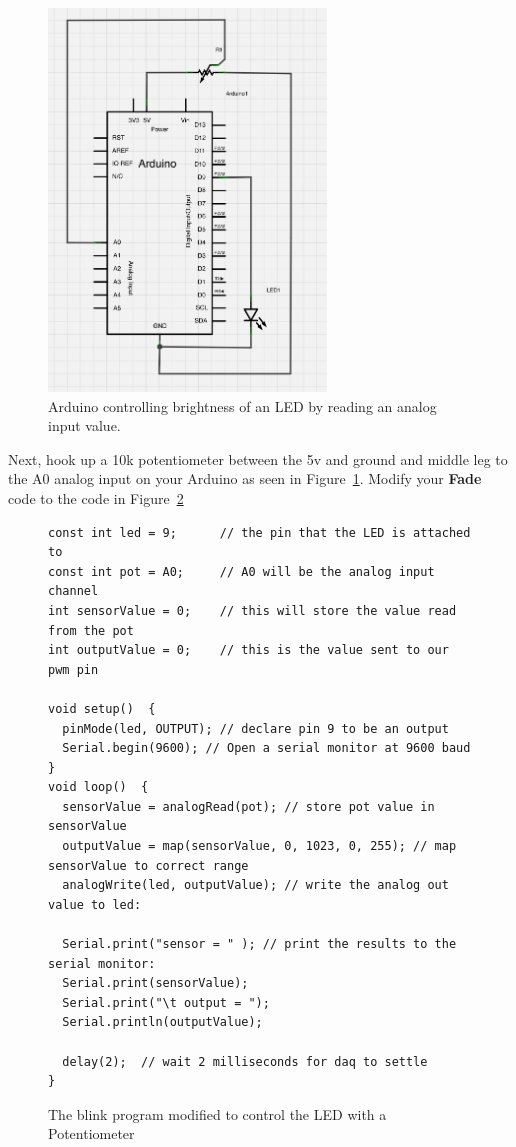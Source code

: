 \documentclass[11pt,a4paper]{article}
\begin{document}
\begin{figure}[htbp]
    \centering
        \includegraphics[height=4in]{figures/pot-fade.png}
    \caption{Arduino controlling brightness of an LED by reading an analog input value.}
    \label{fig:figures_pot-fade}
\end{figure}


Next, hook up a 10k potentiometer between the 5v and ground and middle leg to the A0 analog input on your Arduino as seen in Figure~\ref{fig:figures_pot-fade}.  Modify your \textbf{Fade} code to the code in Figure~\ref{fig:fade_mod}

\begin{figure}[htbp]
	\centering
\begin{verbatim}
const int led = 9;      // the pin that the LED is attached to
const int pot = A0;     // A0 will be the analog input channel
int sensorValue = 0;    // this will store the value read from the pot
int outputValue = 0;    // this is the value sent to our pwm pin

void setup()  { 
  pinMode(led, OUTPUT); // declare pin 9 to be an output
  Serial.begin(9600); // Open a serial monitor at 9600 baud
} 
void loop()  { 
  sensorValue = analogRead(pot); // store pot value in sensorValue
  outputValue = map(sensorValue, 0, 1023, 0, 255); // map sensorValue to correct range
  analogWrite(led, outputValue); // write the analog out value to led:
  
  Serial.print("sensor = " ); // print the results to the serial monitor:
  Serial.print(sensorValue);      
  Serial.print("\t output = ");      
  Serial.println(outputValue); 

  delay(2);  // wait 2 milliseconds for daq to settle 
}
\end{verbatim}
	\caption{The blink program modified to control the LED with a Potentiometer}
	\label{fig:fade_mod}
\end{figure}
\end{document}
